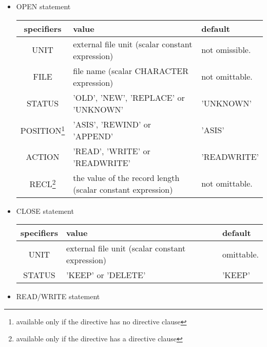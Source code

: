    \begin{itemize}
    \item OPEN statement
   
   \begin{table}[h]
    \begin{center}
     \label{tb:globalopen}
     \begin{tabular}{|c||p{90mm}|l|}
       \hline
      specifiers & value & default \\ \hline \hline
      UNIT & external file unit (scalar constant expression)
	  & not omissible. \\ \hline
      FILE & file name (scalar CHARACTER expression)
	  & not omittable. \\ \hline
      STATUS & 'OLD', 'NEW', 'REPLACE' or 'UNKNOWN' & 'UNKNOWN' \\ \hline
      POSITION\footnote{available only if the directive has no directive
      clause} & 'ASIS', 'REWIND' or 'APPEND' & 'ASIS' \\ \hline
      ACTION & 'READ', 'WRITE' or 'READWRITE' & 'READWRITE' \\ \hline
      RECL\footnote{available only if the directive has a directive clause} & the value of the record length (scalar constant expression)
	  & not omittable. \\ \hline
     \end{tabular}
    \end{center}
   \end{table}

    \item CLOSE statement
	  
   \begin{table}[h]
    \begin{center}
     \label{tb:globalopen}
     \begin{tabular}{|c||p{90mm}|l|}
        \hline
      specifiers & value & default \\ \hline \hline
      UNIT & external file unit (scalar constant expression)
	  & omittable. \\ \hline
      STATUS & 'KEEP' or 'DELETE'
	  & 'KEEP' \\ \hline
     \end{tabular}
    \end{center}
   \end{table}

    \item READ/WRITE statement
	  

\end{itemize}
